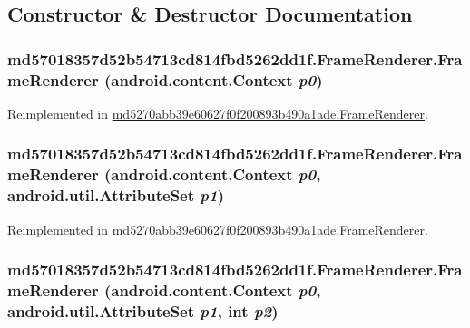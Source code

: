 \subsection{Constructor \& Destructor Documentation}
\hypertarget{classmd57018357d52b54713cd814fbd5262dd1f_1_1_frame_renderer_d9ccbd927d3475ddc5925f7a5ac54325}{
\subsubsection[{FrameRenderer}]{\setlength{\rightskip}{0pt plus 5cm}md57018357d52b54713cd814fbd5262dd1f.FrameRenderer.FrameRenderer (android.content.Context {\em p0})}}
\label{classmd57018357d52b54713cd814fbd5262dd1f_1_1_frame_renderer_d9ccbd927d3475ddc5925f7a5ac54325}




Reimplemented in \hyperlink{classmd5270abb39e60627f0f200893b490a1ade_1_1_frame_renderer_cee389c5c7dfa4207930e0f43ce1349f}{md5270abb39e60627f0f200893b490a1ade.FrameRenderer}.\hypertarget{classmd57018357d52b54713cd814fbd5262dd1f_1_1_frame_renderer_4d6af57c34847b40d0d23873adb2b744}{
\subsubsection[{FrameRenderer}]{\setlength{\rightskip}{0pt plus 5cm}md57018357d52b54713cd814fbd5262dd1f.FrameRenderer.FrameRenderer (android.content.Context {\em p0}, \/  android.util.AttributeSet {\em p1})}}
\label{classmd57018357d52b54713cd814fbd5262dd1f_1_1_frame_renderer_4d6af57c34847b40d0d23873adb2b744}




Reimplemented in \hyperlink{classmd5270abb39e60627f0f200893b490a1ade_1_1_frame_renderer_ea6c9c6c24382a82ce1dec0437826cbc}{md5270abb39e60627f0f200893b490a1ade.FrameRenderer}.\hypertarget{classmd57018357d52b54713cd814fbd5262dd1f_1_1_frame_renderer_f14bbf276a028d7c7d94a1530288998c}{
\subsubsection[{FrameRenderer}]{\setlength{\rightskip}{0pt plus 5cm}md57018357d52b54713cd814fbd5262dd1f.FrameRenderer.FrameRenderer (android.content.Context {\em p0}, \/  android.util.AttributeSet {\em p1}, \/  int {\em p2})}}
\label{classmd57018357d52b54713cd814fbd5262dd1f_1_1_frame_renderer_f14bbf276a028d7c7d94a1530288998c}




